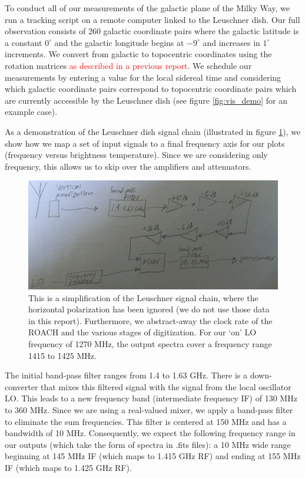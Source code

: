 \documentclass[12pt]{article}
\begin{document}
\quad \quad To conduct all of our measurements of the galactic plane of the Milky Way, we run a tracking script on a remote computer linked to the Leuschner dish. Our full observation consists of 260 galactic coordinate pairs where the galactic latitude is a constant $0^\circ$ and the galactic longitude begins at $-9^\circ$ and increases in $1^\circ$ increments. We convert from galactic to topocentric coordinates using the rotation matrices \textcolor{red}{as described in a previous report}. We schedule our measurements by entering a value for the local sidereal time and considering which galactic coordinate pairs correspond to topocentric coordinate pairs which are currently accessible by the Leuschner dish (see figure \ref{fig:vis_demo} for an example case).

As a demonstration of the Leuschner dish signal chain (illustrated in figure \ref{fig:sig_chain}), we show how we map a set of input signals to a final frequency axis for our plots (frequency versus brightness temperature). Since we are considering only frequency, this allows us to skip over the amplifiers and attenuators.

\begin{figure}
	\centering
	\includegraphics[width=.9\linewidth]{sig_chain}
	\caption{This is a simplification of the Leuschner signal chain, where the horizontal polarization has been ignored (we do not use those data in this report). Furthermore, we abstract-away the clock rate of the ROACH and the various stages of digitization. For our `on' LO frequency of 1270 MHz, the output spectra cover a frequency range 1415 to 1425 MHz.}
	\label{fig:sig_chain}
\end{figure}

The initial band-pass filter ranges from 1.4 to 1.63 GHz. There is a down-converter that mixes this filtered signal with the signal from the local oscillator LO. This leads to a new frequency band (intermediate frequency IF) of 130 MHz to 360 MHz. Since we are using a real-valued mixer, we apply a band-pass filter to eliminate the sum frequencies. This filter is centered at 150 MHz and has a bandwidth of 10 MHz. Consequently, we expect the following frequency range in our outputs (which take the form of spectra in .fits files): a 10 MHz wide range beginning at 145 MHz IF (which maps to 1.415 GHz RF) and ending at 155 MHz IF (which maps to 1.425 GHz RF).
\end{document}
